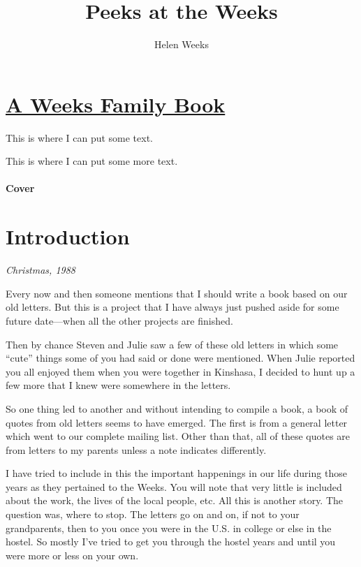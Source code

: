 \documentclass[]{book}
\title{Peeks at the Weeks}
\author{Helen Weeks}
\date{}
\begin{document}
\maketitle

{
\setcounter{tocdepth}{1}
\tableofcontents
}
\hypertarget{a-weeks-family-book}{%
\chapter*{\texorpdfstring{\href{https://beggarsborn.com/peeks-at-the-weeks/}{A Weeks Family Book}}{A Weeks Family Book}}\label{a-weeks-family-book}}

This is where I can put some text.

This is where I can put some more text.

\hypertarget{cover}{%
\subsubsection*{Cover}\label{cover}}

\hypertarget{introduction}{%
\chapter*{Introduction}\label{introduction}}

\emph{Christmas, 1988}

Every now and then someone mentions that I should write a book based on our old letters. But this is a project that I have always just pushed aside for some future date---when all the other projects are finished.

Then by chance Steven and Julie saw a few of these old letters in which some ``cute'' things some of you had said or done were mentioned. When Julie reported you all enjoyed them when you were together in Kinshasa, I decided to hunt up a few more that I knew were somewhere in the letters.

So one thing led to another and without intending to compile a book, a book of quotes from old letters seems to have emerged. The first is from a general letter which went to our complete mailing list. Other than that, all of these quotes are from letters to my parents unless a note indicates differently.

I have tried to include in this the important happenings in our life during those years as they pertained to the Weeks. You will note that very little is included about the work, the lives of the local people, etc. All this is another story. The question was, where to stop. The letters go on and on, if not to your grandparents, then to you once you were in the U.S. in college or else in the hostel. So mostly I've tried to get you through the hostel years and until you were more or less on your own.
\end{document}
